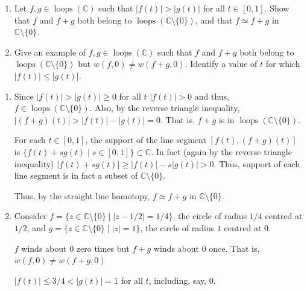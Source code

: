 \documentclass[12 pt, letterpaper]{hmcpset}
\begin{document}
\pagebreak

\begin{problem}[12.]
	\begin{enumerate}
		\item Let $f, g \in \operatorname{loops}(\mathbb{C})$ such that $\lvert f(t) \rvert > \lvert g(t) \rvert$ for all $t \in [0, 1]$. Show that $f$ and $f + g$ both belong to $\operatorname{loops}(\mathbb{C} \setminus \{ 0 \})$, and that $f \simeq f + g$ in $\mathbb{C} \setminus \{ 0 \}$.
		\item Give an example of $f, g \in \operatorname{loops}(\mathbb{C})$ such that $f$ and $f + g$ both belong to $\operatorname{loops}(\mathbb{C} \setminus \{ 0 \})$ but $w(f, 0) \neq w(f + g, 0)$. Identify a value of $t$ for which $\lvert f(t) \rvert \le \lvert g(t) \rvert$.
	\end{enumerate}
\end{problem}

\begin{solution}
	\begin{enumerate}
		\item Since $\lvert f(t) \rvert > \lvert g(t) \rvert \ge 0$ for all $t$ $\lvert f(t) \rvert > 0$ and thus, $f \in \operatorname{loops}(\mathbb{C} \setminus \{ 0 \})$. Also, by the reverse triangle inequality, $\lvert (f + g)(t) \rvert > \lvert f(t) \rvert - \lvert g(t) \rvert = 0$. That is, $f + g$ is in $\operatorname{loops}(\mathbb{C} \setminus \{ 0 \})$.

			For each $t \in [0, 1]$, the support of the line segment $[f(t), (f + g)(t)]$ is $\{ f(t) + s g(t) \mid s \in [0, 1] \} \subset \mathbb{C}$. In fact (again by the reverse triangle inequality) $\lvert f(t) + s g(t) \rvert \ge \lvert f(t) \rvert - s \lvert g(t) \rvert > 0$. Thus, support of each line segment is in fact a subset of $\mathbb{C} \setminus \{ 0 \}$.

			Thus, by the straight line homotopy, $f \simeq f + g$ in $\mathbb{C} \setminus \{ 0 \}$.
		\item Consider $f = \{ z \in \mathbb{C} \setminus \{ 0 \} \mid \lvert z - 1/2 \rvert = 1/4 \}$, the circle of radius $1/4$ centred at $1/2$, and $g = \{ z \in \mathbb{C} \setminus \{ 0 \} \mid \lvert z \rvert = 1 \}$, the circle of radius $1$ centred at $0$.

			$f$ winds about $0$ zero times but $f + g$ winds about $0$ once. That is, $w(f, 0) \neq w(f + g, 0)$

			$\lvert f(t) \rvert \le 3/4 < \lvert g(t) \rvert = 1$ for all $t$, including, say, $0$.
	\end{enumerate}
\end{solution}
\end{document}
